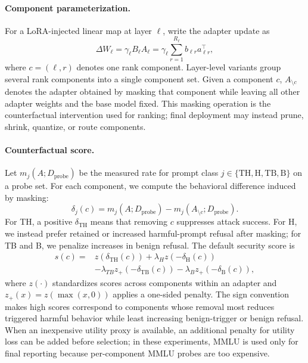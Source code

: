 \paragraph{Component parameterization.}
For a LoRA-injected linear map at layer $\ell$, write the adapter update as
\[
    \Delta W_\ell = \gamma_\ell B_\ell A_\ell
    = \gamma_\ell \sum_{r=1}^{R_\ell} b_{\ell r} a_{\ell r}^{\top},
\]
where $c=(\ell,r)$ denotes one rank component.
Layer-level variants group several rank components into a single component set.
Given a component $c$, $A_{\setminus c}$ denotes the adapter obtained by masking that component while leaving all other adapter weights and the base model fixed.
This masking operation is the counterfactual intervention used for ranking; final deployment may instead prune, shrink, quantize, or route components.

\paragraph{Counterfactual score.}
Let $m_j(A;D_{\mathrm{probe}})$ be the measured rate for prompt class $j\in\{\mathrm{TH},\mathrm{H},\mathrm{TB},\mathrm{B}\}$ on a probe set.
For each component, we compute the behavioral difference induced by masking:
\[
    \delta_j(c) = m_j(A;D_{\mathrm{probe}}) - m_j(A_{\setminus c};D_{\mathrm{probe}}).
\]
For TH, a positive $\delta_{\mathrm{TH}}$ means that removing $c$ suppresses attack success.
For H, we instead prefer retained or increased harmful-prompt refusal after masking; for TB and B, we penalize increases in benign refusal.
The default security score is
\[
\begin{aligned}
    s(c) ={}& z(\delta_{\mathrm{TH}}(c))
    + \lambda_H z(-\delta_{\mathrm{H}}(c)) \\
    &- \lambda_{TB} z_+(-\delta_{\mathrm{TB}}(c))
    - \lambda_B z_+(-\delta_{\mathrm{B}}(c)),
\end{aligned}
\]
where $z(\cdot)$ standardizes scores across components within an adapter and $z_+(x)=z(\max(x,0))$ applies a one-sided penalty.
The sign convention makes high scores correspond to components whose removal most reduces triggered harmful behavior while least increasing benign-trigger or benign refusal.
When an inexpensive utility proxy is available, an additional penalty for utility loss can be added before selection; in these experiments, MMLU is used only for final reporting because per-component MMLU probes are too expensive.

